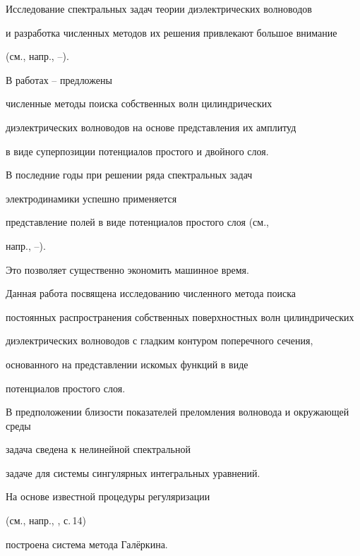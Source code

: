 \maketitle


\label{begin}





Исследование спектральных задач теории диэлектрических волноводов


и разработка численных методов их решения привлекают большое внимание


(см., напр., \cite{199603040005}--\cite{199703200003}). 


В работах \cite{209611220006}--\cite{209611220008} предложены 


численные методы поиска собственных волн цилиндрических


диэлектрических волноводов на основе представления их амплитуд


в виде суперпозиции потенциалов простого и двойного слоя. 


В последние годы при решении ряда спектральных задач 


электродинамики успешно применяется


представление полей в виде потенциалов простого слоя (см.,


напр., \cite{209611220015}--\cite{199603040008}). 


Это позволяет существенно экономить машинное время.





Данная работа посвящена исследованию численного метода поиска


постоянных распространения собственных поверхностных волн цилиндрических


диэлектрических волноводов с гладким контуром поперечного сечения, 


основанного на представлении искомых функций в виде 


потенциалов простого слоя.


В предположении близости показателей преломления волновода и окружающей среды


задача сведена к нелинейной спектральной 


задаче для системы сингулярных интегральных уравнений.


На основе известной процедуры регуляризации 


(см., напр., \cite{209611220016}, с.\,14)


построена система метода Гал\"еркина.



